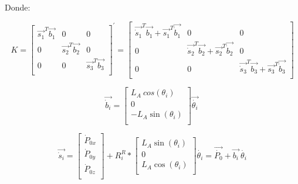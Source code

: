         Donde:
        
         \[ K= \left[ \begin{matrix}
        \overrightarrow{s_{1}}^{T}\overrightarrow{b_{1}}  &  0  &  0\\
        0  &  \overrightarrow{s_{2}}^{T}\overrightarrow{b_{2}}  &  0\\
        0  &  0  &  \overrightarrow{s_{3}}^{T}\overrightarrow{b_{3}}\\
        \end{matrix}
         \right] ^{'}= \left[ \begin{matrix}
        \overrightarrow{\dot{s}_{1}}^{T}\overrightarrow{b_{1}}+\overrightarrow{s_{1}}^{T}\overrightarrow{\dot{b}_{1}}  &  0  &  0\\
        0  &  \overrightarrow{\dot{s}_{2}}^{T}\overrightarrow{b_{2}}+\overrightarrow{s_{2}}^{T}\overrightarrow{\dot{b}_{2}}  &  0\\
        0  &  0  &  \overrightarrow{\dot{s}_{3}}^{T}\overrightarrow{b_{3}}+\overrightarrow{s_{3}}^{T}\overrightarrow{\dot{b}_{3}}\\
        \end{matrix}
         \right]  \]
        
        \begin{equation*}
          \overrightarrow{\dot{b}_{i}}= \left[ \begin{matrix}
        L_{A}~cos\left(  \theta _{i} \right) \\
        0\\
        - L_{A}\sin \left(  \theta _{i} \right) \\
        \end{matrix}
         \right] \overrightarrow{\dot{ \theta _{i}}}~  
        \end{equation*}
        
         \[ \overrightarrow{\dot{s}_{i}}= \left[ \begin{matrix}
        \dot{P}_{0x}\\
        \dot{P}_{0y}\\
        \dot{P}_{0z}\\
        \end{matrix}
         \right] +R_{i}^{R}\ast \left[ \begin{matrix}
        L_{A}\sin  \left(  \theta _{i} \right) \\
        0\\
        L_{A}\cos  \left(  \theta _{i} \right) \\
        \end{matrix}
         \right] \dot{ \theta _{i}}=\overrightarrow{\dot{P_{0}}}+\overrightarrow{b_{i}}~\dot{ \theta _{i}} \]
        

